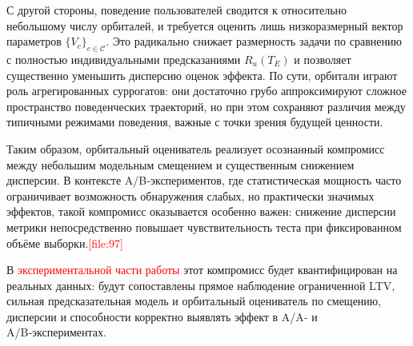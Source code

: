 С другой стороны, поведение пользователей сводится к относительно
небольшому числу орбиталей, и требуется оценить лишь низкоразмерный
вектор параметров $\{V_c\}_{c \in \mathcal{C}}$. Это радикально
снижает размерность задачи по сравнению с полностью индивидуальными
предсказаниями $R_u(T_E)$ и позволяет существенно уменьшить дисперсию
оценок эффекта. По сути, орбитали играют роль агрегированных суррогатов:
они достаточно грубо аппроксимируют сложное пространство
поведенческих траекторий, но при этом сохраняют различия между
типичными режимами поведения, важные с точки зрения будущей ценности.

Таким образом, орбитальный оцениватель реализует осознанный компромисс
между небольшим модельным смещением и существенным снижением дисперсии.
В контексте A/B‑экспериментов, где статистическая мощность часто
ограничивает возможность обнаружения слабых, но практически значимых
эффектов, такой компромисс оказывается особенно важен: снижение
дисперсии метрики непосредственно повышает чувствительность теста
при фиксированном объёме выборки.\textcolor{red}{[file:97]}


В \textcolor{red}{экспериментальной части работы} этот компромисс будет
квантифицирован на реальных данных: будут сопоставлены прямое
наблюдение ограниченной LTV, сильная предсказательная модель и
орбитальный оцениватель по смещению, дисперсии и способности
корректно выявлять эффект в A/A‑ и A/B‑экспериментах.
